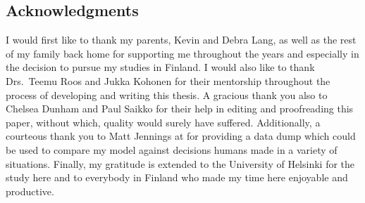 \vspace*{\fill}
\begin{centering}

\section*{Acknowledgments}
\label{sec:thanks}

\end{centering}


I would first like to thank my parents, Kevin and Debra Lang,
as well as the rest of my family back home
for supporting me
throughout the years and especially in the decision to pursue my studies
in Finland.
%
I would also
like to thank Drs.\ Teemu Roos
and Jukka Kohonen
for %
their mentorship throughout the
process of developing and writing this thesis.
%
A gracious thank you also to Chelsea Dunham and Paul Saikko
for their help in editing and proofreading this paper,
without which,
quality would surely have suffered.
%
Additionally,
a courteous thank you to Matt Jennings at
 for providing a data dump
which could be used to compare my model against decisions humans made
in a variety of situations.
%
Finally, my gratitude is extended to the University of Helsinki for the
study here
and to everybody in Finland who made my time here enjoyable and productive.


\vspace*{\fill}
\vspace*{\fill}
\newpage
